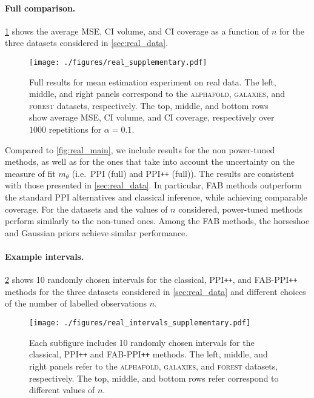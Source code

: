 \paragraph{Full comparison.}
\cref{fig:real_supplementary} shows the average MSE, CI volume, and CI coverage as a function of $n$ for the three datasets considered in \cref{sec:real_data}.
\begin{figure}[ht!]
    \centering
    \texttt{[image: ./figures/real\_supplementary.pdf]}
    \caption{Full results for  mean estimation experiment on real data. The left, middle, and right panels correspond to the \textsc{alphafold}, \textsc{galaxies}, and \textsc{forest} datasets, respectively. The top, middle, and bottom rows show average MSE, CI volume, and CI coverage, respectively over $1000$ repetitions for $\alpha = 0.1$.}
    \label{fig:real_supplementary}
\end{figure}
Compared to \cref{fig:real_main}, we include results for the non power-tuned methods, as well as for the ones that take into account the uncertainty on the measure of fit $m_\theta$ (i.e.~PPI (full) and PPI\texttt{++} (full)). The results are consistent with those presented in \cref{sec:real_data}. In particular, FAB methods outperform the standard PPI alternatives and classical inference, while achieving comparable coverage. For the datasets and the values of $n$ considered, power-tuned methods perform similarly to the non-tuned ones. Among the FAB methods, the horseshoe and Gaussian priors achieve similar performance.

\paragraph{Example intervals.}
\cref{fig:real_intervals_supplementary} shows 10 randomly chosen intervals for the classical, PPI\texttt{++}, and FAB-PPI\texttt{++} methods for the three datasets considered in \cref{sec:real_data} and different choices of the number of labelled observations $n$.
\begin{figure}[ht!]
    \centering
    \texttt{[image: ./figures/real\_intervals\_supplementary.pdf]}
    \caption{Each subfigure includes 10 randomly chosen intervals for the classical, PPI\texttt{++} and FAB-PPI\texttt{++} methods. The left, middle, and right panels refer to the \textsc{alphafold}, \textsc{galaxies}, and \textsc{forest} datasets, respectively. The top, middle, and bottom rows refer correspond to different values of $n$.}
    \label{fig:real_intervals_supplementary}
\end{figure}

